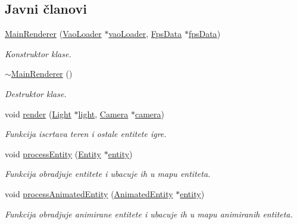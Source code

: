 \subsection*{Javni članovi}
\begin{DoxyCompactItemize}
\item 
\hyperlink{classcore_1_1MainRenderer_abe5c50d41cd58c1c89f290ffffae78dc}{Main\+Renderer} (\hyperlink{classcore_1_1VaoLoader}{Vao\+Loader} $\ast$\hyperlink{namespacecore_a78dd24784c415d3759a0f71b8f4f9f81}{vao\+Loader}, \hyperlink{classutility_1_1FpsData}{Fps\+Data} $\ast$\hyperlink{classcore_1_1MainRenderer_a0ea0659ecfb85286fb5f2bb1d8dc1be1}{fps\+Data})
\begin{DoxyCompactList}\small\item\em Konstruktor klase. \end{DoxyCompactList}\item 
\hyperlink{classcore_1_1MainRenderer_a1e5f39d2178a7c5738efa9be9bd486da}{$\sim$\+Main\+Renderer} ()
\begin{DoxyCompactList}\small\item\em Destruktor klase. \end{DoxyCompactList}\item 
void \hyperlink{classcore_1_1MainRenderer_a3a8f4927df78f7b0ea7c4e5902569b1e}{render} (\hyperlink{classentity_1_1Light}{Light} $\ast$\hyperlink{namespacecore_a2324d96000e7c6d42570a0577e8f070b}{light}, \hyperlink{classentity_1_1Camera}{Camera} $\ast$\hyperlink{namespacecore_a9d645c490b142886301256f6cf9c65c2}{camera})
\begin{DoxyCompactList}\small\item\em Funkcija iscrtava teren i ostale entitete igre. \end{DoxyCompactList}\item 
void \hyperlink{classcore_1_1MainRenderer_ae5ffaef40e727ab758d7b2d36ed4e92a}{process\+Entity} (\hyperlink{classentity_1_1Entity}{Entity} $\ast$\hyperlink{namespacecore_aa710c0ea388433d2d80d1d1c67582eda}{entity})
\begin{DoxyCompactList}\small\item\em Funkcija obradjuje entitete i ubacuje ih u mapu entiteta. \end{DoxyCompactList}\item 
void \hyperlink{classcore_1_1MainRenderer_ac9be9ef0cda2ee739635c0a9bb152df3}{process\+Animated\+Entity} (\hyperlink{classentity_1_1AnimatedEntity}{Animated\+Entity} $\ast$\hyperlink{namespacecore_aa710c0ea388433d2d80d1d1c67582eda}{entity})
\begin{DoxyCompactList}\small\item\em Funkcija obradjuje animirane entitete i ubacuje ih u mapu animiranih entiteta. \end{DoxyCompactList}\item 

\end{DoxyCompactItemize}
